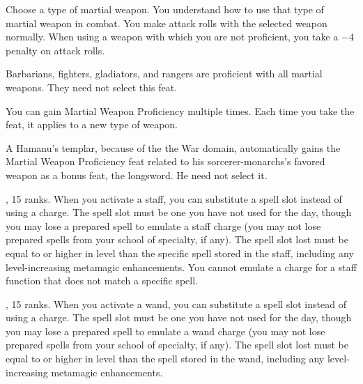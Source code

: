 

{Choose a type of martial weapon. You understand how to use that type of martial weapon in combat.}
{}
{You make attack rolls with the selected weapon normally.}
{When using a weapon with which you are not proficient, you take a $-4$ penalty on attack rolls.}
{Barbarians, fighters, gladiators, and rangers are proficient with all martial weapons. They need not select this feat.

You can gain Martial Weapon Proficiency multiple times. Each time you take the feat, it applies to a new type of weapon.

A Hamanu's templar, because of the the War domain, automatically gains the Martial Weapon Proficiency feat related to his sorcerer-monarchs's favored weapon as a bonus feat, the longsword. He need not select it.}

{,  15 ranks.}
{When you activate a staff, you can substitute a spell slot instead of using a charge. The spell slot must be one you have not used for the day, though you may lose a prepared spell to emulate a staff charge (you may not lose prepared spells from your school of specialty, if any). The spell slot lost must be equal to or higher in level than the specific spell stored in the staff, including any level-increasing metamagic enhancements. You cannot emulate a charge for a staff function that does not match a specific spell.}

{,  15 ranks.}
{When you activate a wand, you can substitute a spell slot instead of using a charge. The spell slot must be one you have not used for the day, though you may lose a prepared spell to emulate a wand charge (you may not lose prepared spells from your school of specialty, if any). The spell slot lost must be equal to or higher in level than the spell stored in the wand, including any level-increasing metamagic enhancements.}

